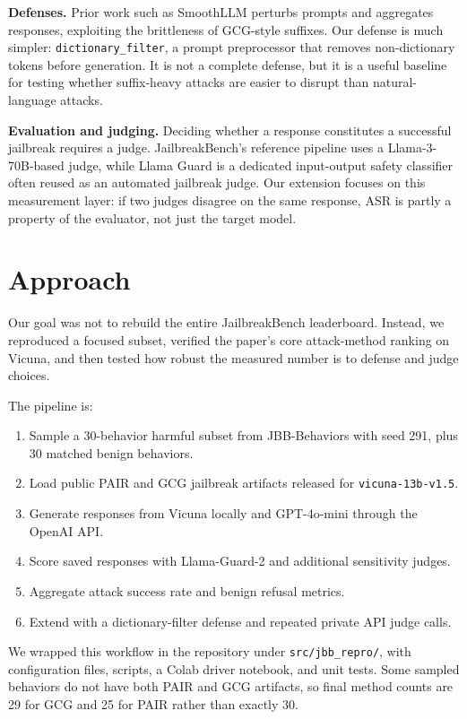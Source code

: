 \documentclass{article}
\begin{document}
\textbf{Defenses.} Prior work such as SmoothLLM \cite{robey2024smoothllm} perturbs prompts and aggregates responses, exploiting the brittleness of GCG-style suffixes. Our defense is much simpler: \texttt{dictionary\_filter}, a prompt preprocessor that removes non-dictionary tokens before generation. It is not a complete defense, but it is a useful baseline for testing whether suffix-heavy attacks are easier to disrupt than natural-language attacks.

\textbf{Evaluation and judging.} Deciding whether a response constitutes a successful jailbreak requires a judge. JailbreakBench's reference pipeline uses a Llama-3-70B-based judge, while Llama Guard \cite{inan2023llamaguard} is a dedicated input-output safety classifier often reused as an automated jailbreak judge. Our extension focuses on this measurement layer: if two judges disagree on the same response, ASR is partly a property of the evaluator, not just the target model.

\section{Approach}

Our goal was not to rebuild the entire JailbreakBench leaderboard. Instead, we reproduced a focused subset, verified the paper's core attack-method ranking on Vicuna, and then tested how robust the measured number is to defense and judge choices.

The pipeline is:
\begin{enumerate}
  \item Sample a 30-behavior harmful subset from JBB-Behaviors with seed 291, plus 30 matched benign behaviors.
  \item Load public PAIR and GCG jailbreak artifacts released for \texttt{vicuna-13b-v1.5}.
  \item Generate responses from Vicuna locally and GPT-4o-mini through the OpenAI API.
  \item Score saved responses with Llama-Guard-2 and additional sensitivity judges.
  \item Aggregate attack success rate and benign refusal metrics.
  \item Extend with a dictionary-filter defense and repeated private API judge calls.
\end{enumerate}

We wrapped this workflow in the repository under \texttt{src/jbb\_repro/}, with configuration files, scripts, a Colab driver notebook, and unit tests. Some sampled behaviors do not have both PAIR and GCG artifacts, so final method counts are 29 for GCG and 25 for PAIR rather than exactly 30.
\end{document}
